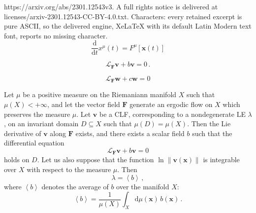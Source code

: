 \documentclass[10pt,a4paper]{amsart}
\newcommand{\vect}[1]{\boldsymbol{#1}}
\begin{document}
https://arxiv.org/abs/2301.12543v3. A full rights notice is delivered at licenses/arxiv-2301.12543-CC-BY-4.0.txt. Characters: every retained excerpt is pure ASCII, so the delivered engine, XeLaTeX with its default Latin Modern text font, reports no missing character.
\begin{equation}
  \frac{\mathrm{d}}{\mathrm{d}t} x^{\mu}(t) = 
  F^{\mu}\left[\vect{x}(t)\right] 
  \label{eq:xp}
\end{equation}

 \begin{equation}
    \mathcal{L}_{\vect{F}} \vect{v} + b \vect v = 0 \,.
    \label{eq:alt:def}
  \end{equation}  

\begin{equation}\label{eq:walt:def}
\mathcal{L}_{\vect{F}}\vect{w} + c \vect w = 0
\end{equation}

\begin{proposition}  \label{prop:1}
Let $\mu$ be a positive measure on the Riemaniann manifold $X$ such
that $\mu(X)<+\infty$, and let the vector field $\vect{F}$ generate an
ergodic flow on $X$ which preserves the measure $\mu$.  Let $\vect{v}$
be a CLF, corresponding to a nondegenerate LE $\lambda$, on an
invariant domain \mbox{$D\subseteq X$} such that $\mu(D)=\mu(X)$.
Then the Lie derivative of $\vect{v}$ along $\vect{F}$ exists, and
there exists a scalar field $b$ such that the differential equation 
\[
 \mathcal{L}_{\vect{F}} \vect{v} + b \vect v = 0 
\]
holds on $D$. 
Let us also suppose that the function 
$\ln \lVert \vect{v}\left(\vect {x}\right) \rVert$ is integrable over $X$ 
with respect to the measure $\mu$. Then
  \begin{equation}\label{eq:lambda_b}
    \lambda=\left<b\right>\,, 
  \end{equation}
  where $\left<b\right>$ denotes the
  average of $b$ over the manifold $X$:
  \begin{equation}\label{eq:aver_b}
    \left<b\right>=  \frac {1}{\mu(X)}
    \int_X \mathrm{d}\mu (\vect{x})\, b(\vect{x}) \, .
  \end{equation}
\end{proposition}
\end{document}
